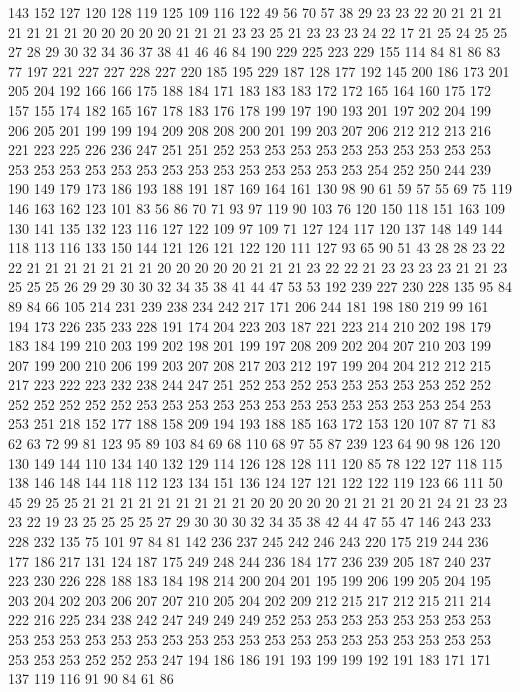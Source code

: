143 152 127 120 128 119 125 109 116 122 49 56 70 57 38 29 23 23 22 20
21 21 21 21 21 21 21 20 20 20 20 20 21 21 21 23 23 25 21 23
23 23 24 22 17 21 25 24 25 25 27 28 29 30 32 34 36 37 38 41
46 46 84 190 229 225 223 229 155 114 84 81 86 83 77 197 221 227 227 228
227 220 185 195 229 187 128 177 192 145 200 186 173 201 205 204 192 166 166 175
188 184 171 183 183 183 172 172 165 164 160 175 172 157 155 174 182 165 167 178
183 176 178 199 197 190 193 201 197 202 204 199 206 205 201 199 199 194 209 208
208 200 201 199 203 207 206 212 212 213 216 221 223 225 226 236 247 251 251 252
253 253 253 253 253 253 253 253 253 253 253 253 253 253 253 253 253 253 253 253
253 253 253 253 254 252 250 244 239 190 149 179 173 186 193 188 191 187 169 164
161 130 98 90 61 59 57 55 69 75 119 146 163 162 123 101 83 56 86 70
71 93 97 119 90 103 76 120 150 118 151 163 109 130 141 135 132 123 116 127
122 109 97 109 71 127 124 117 120 137 148 149 144 118 113 116 133 150 144 121
126 121 122 120 111 127 93 65 90 51 43 28 28 23 22 22 21 21 21 21
21 21 21 20 20 20 20 20 21 21 21 23 22 22 21 23 23 23 23 21
21 23 25 25 25 26 29 29 30 30 32 34 35 38 41 44 47 53 53 192
239 227 230 228 135 95 84 89 84 66 105 214 231 239 238 234 242 217 171 206
244 181 198 180 219 99 161 194 173 226 235 233 228 191 174 204 223 203 187 221
223 214 210 202 198 179 183 184 199 210 203 199 202 198 201 199 197 208 209 202
204 207 210 203 199 207 199 200 210 206 199 203 207 208 217 203 212 197 199 204
204 212 212 215 217 223 222 223 232 238 244 247 251 252 253 252 253 253 253 253
253 252 252 252 252 252 252 252 253 253 253 253 253 253 253 253 253 253 253 253
254 253 253 251 218 152 177 188 158 209 194 193 188 185 163 172 153 120 107 87
71 83 62 63 72 99 81 123 95 89 103 84 69 68 110 68 97 55 87 239
123 64 90 98 126 120 130 149 144 110 134 140 132 129 114 126 128 128 111 120
85 78 122 127 118 115 138 146 148 144 118 112 123 134 151 136 124 127 121 122
122 119 123 66 111 50 45 29 25 25 21 21 21 21 21 21 21 21 21 20
20 20 20 20 21 21 21 20 21 24 21 23 23 23 22 19 23 25 25 25
25 27 29 30 30 30 32 34 35 38 42 44 47 55 47 146 243 233 228 232
135 75 101 97 84 81 142 236 237 245 242 246 243 220 175 219 244 236 177 186
217 131 124 187 175 249 248 244 236 184 177 236 239 205 187 240 237 223 230 226
228 188 183 184 198 214 200 204 201 195 199 206 199 205 204 195 203 204 202 203
206 207 207 210 205 204 202 209 212 215 217 212 215 211 214 222 216 225 234 238
242 247 249 249 249 252 253 253 253 253 253 253 253 253 253 253 253 253 253 253
253 253 253 253 253 253 253 253 253 253 253 253 253 253 253 253 252 252 253 247
194 186 186 191 193 199 199 192 191 183 171 171 137 119 116 91 90 84 61 86
